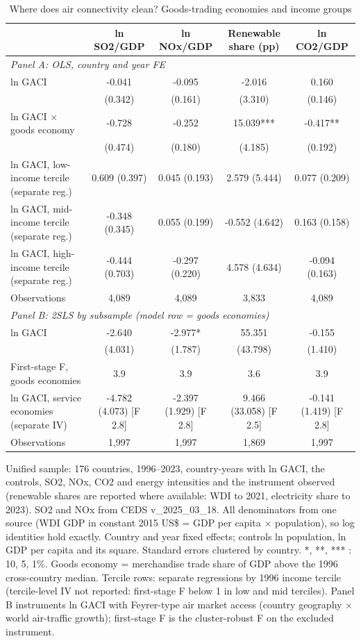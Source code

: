 \begin{table}[htbp]\centering\small
\caption{Where does air connectivity clean? Goods-trading economies and income groups}\label{tab:T4}
\begin{tabular}{lcccc}
\toprule
 & ln SO2/GDP & ln NOx/GDP & Renewable share (pp) & ln CO2/GDP \\
\midrule
\midrule
\multicolumn{5}{l}{\textit{Panel A: OLS, country and year FE}} \\
ln GACI & -0.041 & -0.095 & -2.016 & 0.160 \\
 & (0.342) & (0.161) & (3.310) & (0.146) \\
ln GACI $\times$ goods economy & -0.728 & -0.252 & 15.039*** & -0.417** \\
 & (0.474) & (0.180) & (4.185) & (0.192) \\
ln GACI, low-income tercile (separate reg.) & 0.609 (0.397) & 0.045 (0.193) & 2.579 (5.444) & 0.077 (0.209) \\
ln GACI, mid-income tercile (separate reg.) & -0.348 (0.345) & 0.055 (0.199) & -0.552 (4.642) & 0.163 (0.158) \\
ln GACI, high-income tercile (separate reg.) & -0.444 (0.703) & -0.297 (0.220) & 4.578 (4.634) & -0.094 (0.163) \\
\midrule
Observations & 4,089 & 4,089 & 3,833 & 4,089 \\
\midrule
\multicolumn{5}{l}{\textit{Panel B: 2SLS by subsample (model row = goods economies)}} \\
ln GACI & -2.640 & -2.977* & 55.351 & -0.155 \\
 & (4.031) & (1.787) & (43.798) & (1.410) \\
First-stage F, goods economies & 3.9 & 3.9 & 3.6 & 3.9 \\
ln GACI, service economies (separate IV) & -4.782 (4.073)  [F 2.8] & -2.397 (1.929)  [F 2.8] & 9.466 (33.058)  [F 2.5] & -0.141 (1.419)  [F 2.8] \\
\midrule
Observations & 1,997 & 1,997 & 1,869 & 1,997 \\
\bottomrule
\end{tabular}
\begin{minipage}{0.95\textwidth}\footnotesize Unified sample: 176 countries, 1996--2023, country-years with ln GACI, the controls, SO2, NOx, CO2 and energy intensities and the instrument observed (renewable shares are reported where available: WDI to 2021, electricity share to 2023). SO2 and NOx from CEDS v\_2025\_03\_18. All denominators from one source (WDI GDP in constant 2015 US\$ = GDP per capita $\times$ population), so log identities hold exactly. Country and year fixed effects; controls ln population, ln GDP per capita and its square. Standard errors clustered by country. *, **, *** : 10, 5, 1\%. Goods economy = merchandise trade share of GDP above the 1996 cross-country median. Tercile rows: separate regressions by 1996 income tercile (tercile-level IV not reported: first-stage F below 1 in low and mid terciles). Panel B instruments ln GACI with Feyrer-type air market access (country geography $\times$ world air-traffic growth); first-stage F is the cluster-robust F on the excluded instrument.\end{minipage}
\end{table}